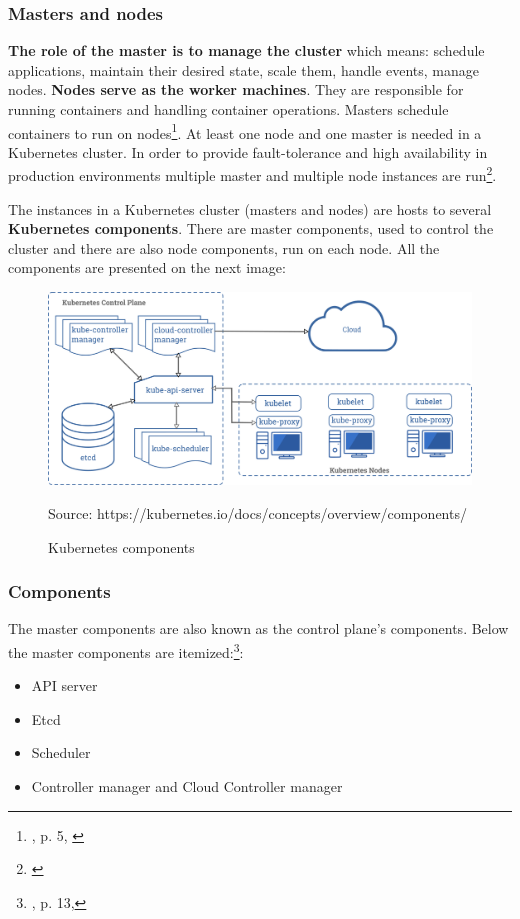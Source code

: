 \documentclass[12pt]{article}
\begin{document}
\subsubsection{Masters and nodes}
\textbf{The role of the master is to manage the cluster} which means: schedule applications, maintain their desired state, scale them, handle events, manage nodes. \textbf{Nodes serve as the worker machines}. They are responsible for running containers and handling container operations. Masters schedule containers to run on nodes\footnote{\cite{book-mastering-k8s}, p. 5, \cite{k8s-cluster}}. At least one node and one master is needed in a Kubernetes cluster. In order to provide fault-tolerance and high availability in production environments multiple master and multiple node instances are run\footnote{\cite{k8s-components}}.

The instances in a Kubernetes cluster (masters and nodes) are hosts to several \textbf{Kubernetes components}. There are master components, used to control the cluster and there are also node components, run on each node. All the components are presented on the next image:
\begin{figure}[H]
    \centering
    \includegraphics[width=14cm]{figures/components-of-kubernetes.png}
    \label{fig:cluster}
    \caption{Kubernetes components}
    \small{Source: https://kubernetes.io/docs/concepts/overview/components/}
\end{figure}


\subsubsection{Components}
The master components are also known as the control plane’s components. Below the master components are itemized:\footnote{\cite{book-mastering-k8s}, p. 13,\cite{k8s-components}}:
\begin{itemize}
\item API server
\item Etcd
\item Scheduler
\item Controller manager and Cloud Controller manager
\end{itemize}
\end{document}
